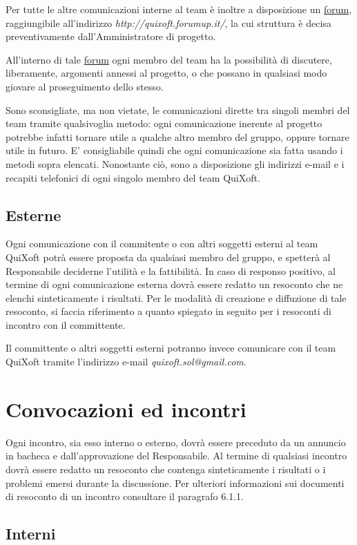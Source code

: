 \documentclass[11pt,a4paper]{article}
\begin{document}
Per tutte le altre comunicazioni interne al team è inoltre a disposizione un \underline{forum}, raggiungibile all'indirizzo \textit{http://quixoft.forumup.it/}, la cui struttura è decisa preventivamente dall'Amministratore di progetto.

All'interno di tale \underline{forum} ogni membro del team ha la possibilità di discu\-tere, liberamente, argomenti annessi al
progetto, o che possano in qualsiasi modo giovare al proseguimento dello stesso.

Sono sconsigliate, ma non vietate, le comunicazioni dirette tra singoli membri del team tramite qualsivoglia metodo: ogni comunicazione ineren\-te al progetto potrebbe infatti tornare utile a qualche altro membro del gruppo, oppure tornare utile in futuro.
E' consigliabile quindi che ogni comunicazione sia fatta usando i metodi sopra elencati.
Nonostante ciò, sono a disposizione gli indirizzi e-mail e i recapiti telefonici di ogni singolo membro del team QuiXoft.
\subsection{Esterne}
Ogni comunicazione con il commitente o con altri soggetti esterni al team QuiXoft potrà essere proposta da qualsiasi membro del gruppo, e spetterà al Responsabile deciderne l'utilità e la fattibilità.
In caso di responso positivo, al termine di ogni comunicazione esterna dovrà essere redatto un resoconto che ne elenchi sinteticamente i risultati. Per le modalità di creazione e diffuzione di tale resoconto, si faccia riferimento a quanto spiegato in seguito per i resoconti di incontro con il committente.

Il committente o altri soggetti esterni potranno invece comunicare con il team QuiXoft tramite l'indirizzo e-mail \textit{quixoft.sol@gmail.com}.
\section{Convocazioni ed incontri}
Ogni incontro, sia esso interno o esterno, dovrà essere preceduto da un annuncio in bacheca e dall'approvazione del Responsabile.
Al termine di qualsiasi incontro dovrà essere redatto un resoconto che contenga sinteticamente i risultati o i problemi emersi durante la discussione.
Per ulteriori informazioni sui documenti di resoconto di un incontro consultare il paragrafo 6.1.1.
\subsection{Interni}
\end{document}

